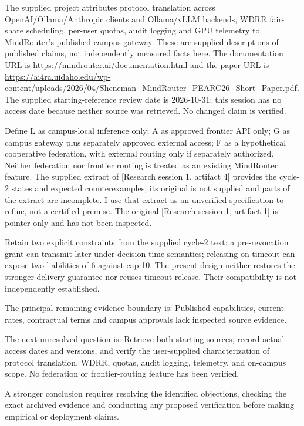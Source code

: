 \documentclass[11pt]{article}
\begin{document}
The supplied project attributes protocol translation across OpenAI/Ollama/Anthropic clients and Ollama/vLLM backends, WDRR fair-share scheduling, per-user quotas, audit logging and GPU telemetry to MindRouter's published campus gateway. These are supplied descriptions of published claims, not independently measured facts here. The documentation URL is \url{https://mindrouter.ai/documentation.html} and the paper URL is \url{https://ai4ra.uidaho.edu/wp-content/uploads/2026/04/Sheneman_MindRouter_PEARC26_Short_Paper.pdf}. The supplied starting-reference review date is 2026-10-31; this session has no access date because neither source was retrieved. No changed claim is verified.

Define L as campus-local inference only; A as approved frontier API only; G as campus gateway plus separately approved external access; F as a hypothetical cooperative federation, with external routing only if separately authorized. Neither federation nor frontier routing is treated as an existing MindRouter feature. The supplied extract of [Research session 1, artifact 4] provides the cycle-2 states and expected counterexamples; its original is not supplied and parts of the extract are incomplete. I use that extract as an unverified specification to refine, not a certified premise. The original [Research session 1, artifact 1] is pointer-only and has not been inspected.

Retain two explicit constraints from the supplied cycle-2 text: a pre-revocation grant can transmit later under decision-time semantics; releasing on timeout can expose two liabilities of 6 against cap 10. The present design neither restores the stronger delivery guarantee nor reuses timeout release. Their compatibility is not independently established.

The principal remaining evidence boundary is: Published capabilities, current rates, contractual terms and campus approvals lack inspected source evidence.

The next unresolved question is: Retrieve both starting sources, record actual access dates and versions, and verify the user-supplied characterization of protocol translation, WDRR, quotas, audit logging, telemetry, and on-campus scope. No federation or frontier-routing feature has been verified.

A stronger conclusion requires resolving the identified objections, checking the exact archived evidence and conducting any proposed verification before making empirical or deployment claims.
\end{document}
